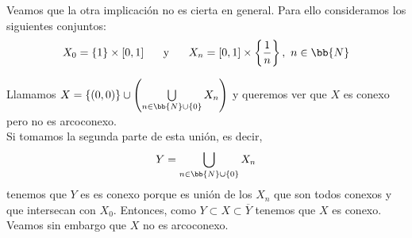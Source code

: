\begin{ejemplo}
    Veamos que la otra implicación no es cierta en general. Para ello consideramos los siguientes conjuntos: 
    \begin{gather*}
        X_0=\{1\}\times [0,1] \hspace{0.5cm}\text{ y } \hspace{0.5cm} X_n = [0,1]\times \left\{\frac{1}{n}\right\},\ n\in \bb{N}
    \end{gather*}

    \begin{figure}[H]
        \centering
    \end{figure}

    Llamamos $X=\{(0,0)\}\cup \left(\bigcup\limits_{n\in \bb{N}\cup \{0\}}X_n\right)$ y queremos ver que $X$ es conexo pero no es arcoconexo.\\

    Si tomamos la segunda parte de esta unión, es decir, 
    \begin{gather*}
        Y=\bigcup\limits_{n\in \bb{N}\cup \{0\}}X_n
    \end{gather*}
    tenemos que $Y$ es es conexo porque es unión de los $X_n$ que son todos conexos y que intersecan con $X_0$. Entonces, como $Y\subset X \subset \overline{Y}$ tenemos que $X$ es conexo. Veamos sin embargo que $X$ no es arcoconexo.\\


\end{ejemplo}
